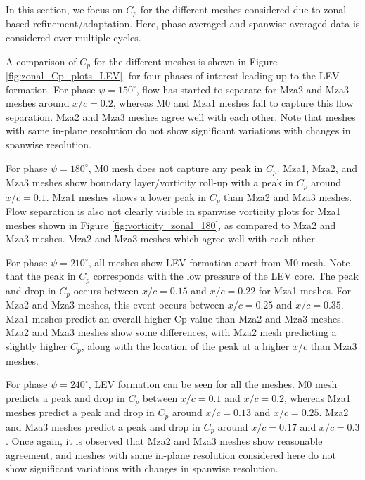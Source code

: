 
In this section, we focus on $C_p$ for the different meshes considered due to zonal-based refinement/adaptation.
Here, phase averaged and spanwise averaged data is considered over multiple cycles.

A comparison of $C_p$ for the different meshes is shown in Figure \ref{fig:zonal_Cp_plots_LEV}, for four phases of interest leading up to the LEV formation. 
For phase $\psi=150^\circ$, flow has started to separate for Mza2 and Mza3 meshes around $x/c = 0.2$, whereas M0 and Mza1 meshes fail to capture this flow separation. 
Mza2 and Mza3 meshes agree well with each other. 
Note that meshes with same in-plane resolution do not show significant variations with changes in spanwise resolution.

 
For phase $\psi=180^\circ$, M0 mesh does not capture any peak in $C_p$.
Mza1, Mza2, and Mza3 meshes show boundary layer/vorticity roll-up with a peak in $C_p$ around $x/c = 0.1$.
Mza1 meshes shows a lower peak in $C_p$ than Mza2 and Mza3 meshes. 
Flow separation is also not clearly visible in spanwise vorticity plots for Mza1 meshes shown in Figure \ref{fig:vorticity_zonal_180}, as compared to Mza2 and Mza3 meshes.
Mza2 and Mza3 meshes which agree well with each other.


For phase $\psi=210^\circ$, all meshes show LEV formation apart from M0 mesh. Note that the peak in $C_p$ corresponds with the low pressure of the LEV core.
The peak and drop in $C_p$ occurs between $x/c=0.15$ and $x/c=0.22$ for Mza1 meshes. 
For Mza2 and Mza3 meshes, this event occurs between $x/c=0.25$ and $x/c=0.35$. Mza1 meshes predict an overall higher Cp value than Mza2 and Mza3 meshes.
Mza2 and Mza3 meshes show some differences, with Mza2 mesh predicting a slightly higher $C_p$, along with the location of the peak at a higher $x/c$ than Mza3 meshes.

For phase $\psi=240^\circ$, LEV formation can be seen for all the meshes.
M0 mesh predicts a peak and drop in $C_p$ between $x/c=0.1$ and $x/c=0.2$, whereas Mza1 meshes predict a peak and drop in $C_p$ around $x/c=0.13$ and $x/c=0.25$. 
Mza2 and Mza3 meshes predict a peak and drop in $C_p$ around $x/c=0.17$ and $x/c=0.3$. 
Once again, it is observed that Mza2 and Mza3 meshes show reasonable agreement, and meshes with same in-plane resolution considered here do not show significant variations with changes in spanwise resolution.


